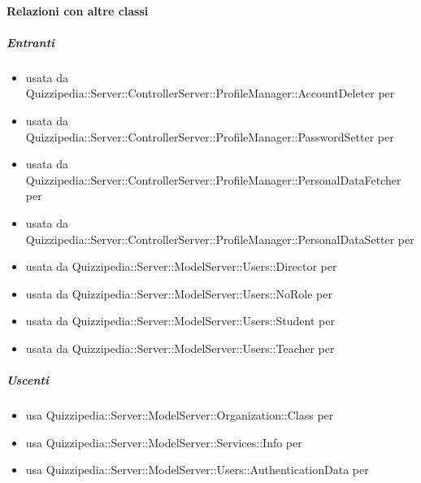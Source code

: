 \paragraph{Relazioni con altre classi}
\subparagraph{Entranti}
\begin{itemize}
\item usata da Quizzipedia::Server::ControllerServer::ProfileManager::AccountDeleter per 
\item usata da Quizzipedia::Server::ControllerServer::ProfileManager::PasswordSetter per 
\item usata da Quizzipedia::Server::ControllerServer::ProfileManager::PersonalDataFetcher per 
\item usata da Quizzipedia::Server::ControllerServer::ProfileManager::PersonalDataSetter per 
\item usata da Quizzipedia::Server::ModelServer::Users::Director per 
\item usata da Quizzipedia::Server::ModelServer::Users::NoRole per 
\item usata da Quizzipedia::Server::ModelServer::Users::Student per 
\item usata da Quizzipedia::Server::ModelServer::Users::Teacher per 
\end{itemize}
\subparagraph{Uscenti}
\begin{itemize}
\item usa Quizzipedia::Server::ModelServer::Organization::Class per 
\item usa Quizzipedia::Server::ModelServer::Services::Info per 
\item usa Quizzipedia::Server::ModelServer::Users::AuthenticationData per 
\end{itemize}
